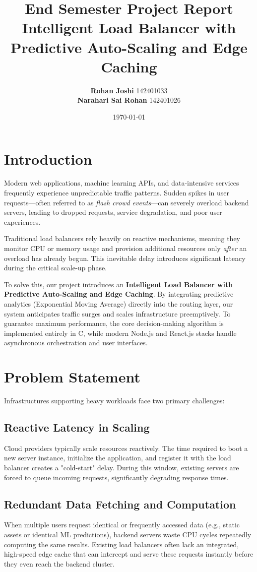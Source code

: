 \documentclass[12pt]{article}
\title{
    \vspace{0.5cm}
    \Huge \textbf{End Semester Project Report} \\
    \vspace{0.5cm}
    \Large \textbf{Intelligent Load Balancer with Predictive Auto-Scaling and Edge Caching} \\
}
\author{
    \textbf{Rohan Joshi} 142401033 \\
    \textbf{Narahari Sai Rohan} 142401026
}
\date{\vspace{0.5cm} \today}
\begin{document}
\maketitle
\thispagestyle{empty}
\newpage

\tableofcontents
\newpage

\section{Introduction}
Modern web applications, machine learning APIs, and data-intensive services frequently experience unpredictable traffic patterns. Sudden spikes in user requests—often referred to as \textit{flash crowd events}—can severely overload backend servers, leading to dropped requests, service degradation, and poor user experiences. 

Traditional load balancers rely heavily on reactive mechanisms, meaning they monitor CPU or memory usage and provision additional resources only \textit{after} an overload has already begun. This inevitable delay introduces significant latency during the critical scale-up phase.

To solve this, our project introduces an \textbf{Intelligent Load Balancer with Predictive Auto-Scaling and Edge Caching}. By integrating predictive analytics (Exponential Moving Average) directly into the routing layer, our system anticipates traffic surges and scales infrastructure preemptively. To guarantee maximum performance, the core decision-making algorithm is implemented entirely in C, while modern Node.js and React.js stacks handle asynchronous orchestration and user interfaces.

\section{Problem Statement}
Infrastructures supporting heavy workloads face two primary challenges:

\subsection{Reactive Latency in Scaling}
Cloud providers typically scale resources reactively. The time required to boot a new server instance, initialize the application, and register it with the load balancer creates a "cold-start" delay. During this window, existing servers are forced to queue incoming requests, significantly degrading response times.

\subsection{Redundant Data Fetching and Computation}
When multiple users request identical or frequently accessed data (e.g., static assets or identical ML predictions), backend servers waste CPU cycles repeatedly computing the same results. Existing load balancers often lack an integrated, high-speed edge cache that can intercept and serve these requests instantly before they even reach the backend cluster.
\end{document}

